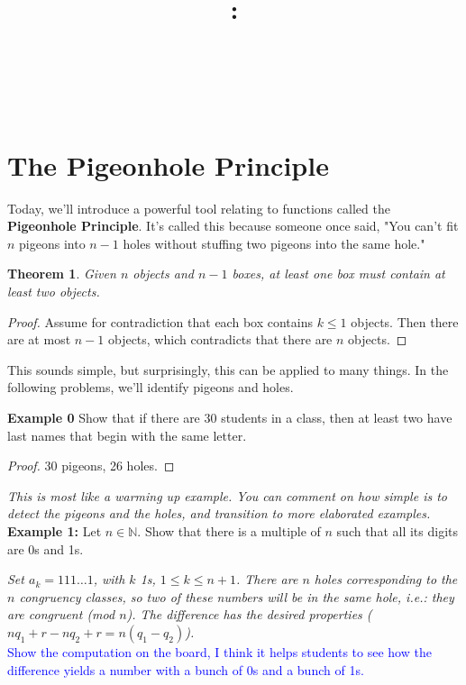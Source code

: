 \documentclass{article}
\title{
    \vspace{2in}
    \textbf{\lectClass:\\ \lectTitle}\\
    \vspace{0.1in}\large{\textit{\lectClassInstructor\ \lectSection}}
    \vspace{3in}
    \author{\textbf{\lectAuthorName}}
    \date{}
}
\newtheorem{theorem}{Theorem}
\begin{document}
\maketitle
\pagebreak

\section*{The Pigeonhole Principle}
Today, we'll introduce a powerful tool relating to functions called the \textbf{Pigeonhole Principle}. It's called this because someone once said, "You can't fit $n$ pigeons into $n - 1$ holes without stuffing two pigeons into the same hole."

\begin{theorem}
Given $n$ objects and $n - 1$ boxes, at least one box must contain at least two objects.
\end{theorem}
\begin{proof}
Assume for contradiction that each box contains $k \leq 1$ objects. Then there are at most $n - 1$ objects, which contradicts that there are $n$ objects.
\end{proof}
This sounds simple, but surprisingly, this can be applied to many things. In the following problems, we'll identify pigeons and holes.



{\bf Example 0} Show that if there are 30 students in a class, then at least two have last names that begin with the same letter.
\begin{proof}
30 pigeons, 26 holes. 
\end{proof}


{\it This is most like a warming up example. You can comment on how simple is to detect the pigeons and the holes, and transition to more elaborated examples.}\\

{\bf Example 1:} Let $n\in \mathbb{N}$. Show that there is a multiple of $n$ such that all its digits are 0s and 1s.

{\it Set $a_k=111\dots 1$, with $k$ 1s, $1\leq k\leq n+1$. There are $n$ holes corresponding to the $n$ congruency classes, so two of these numbers will be in the same hole, i.e.: they are congruent (mod $n$). The difference has the desired properties ($nq_1 + r - nq_2 + r = n(q_1 - q_2)$).}\\


\textcolor{blue}{Show the computation on the board, I think it helps students to see how the difference yields a number with a bunch of 0s and a bunch of 1s.}\\
\end{document}
